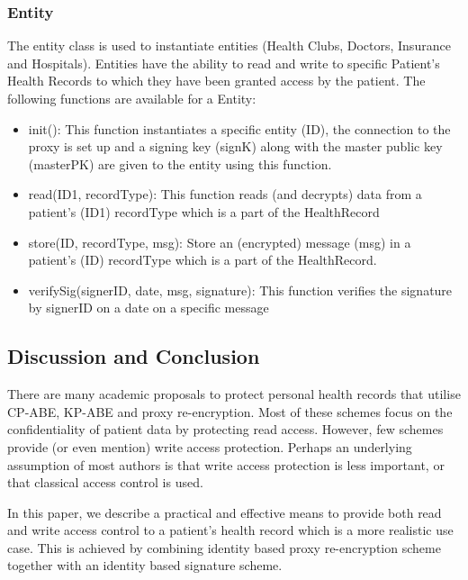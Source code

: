 \documentclass[]{article}
\begin{document}
\subsubsection{Entity}
The entity class is used to instantiate entities (Health Clubs, Doctors, Insurance and Hospitals). Entities have the ability to read and write to specific Patient's Health Records to which they have been granted access by the patient. The following functions are available for a Entity:
\begin{itemize}
\item init(): This function instantiates a specific entity (ID), the connection to the proxy is set up and a signing key (signK) along with the master public key (masterPK) are given to the entity using this function.
\item read(ID1, recordType): This function reads (and decrypts) data from a patient's (ID1) recordType which is a part of the HealthRecord
\item store(ID, recordType, msg): Store an (encrypted) message (msg) in a patient's (ID) recordType which is a part of the HealthRecord.
\item verifySig(signerID, date, msg, signature): This function verifies the signature by signerID on a date on a specific message
\end{itemize}

\subsection{Discussion and Conclusion}
There are many academic proposals to protect personal health records that utilise CP-ABE, KP-ABE and proxy re-encryption. Most of these schemes focus on the confidentiality of patient data by protecting read access. However, few schemes provide (or even mention) write access protection. Perhaps an underlying assumption of most authors is that write access protection is less important, or that classical access control is used. 

In this paper, we describe a practical and effective means to provide both read and write access control to a patient's health record which is a more realistic use case. This is achieved by combining identity based proxy re-encryption scheme together with an identity based signature scheme.


{}
\end{document}
